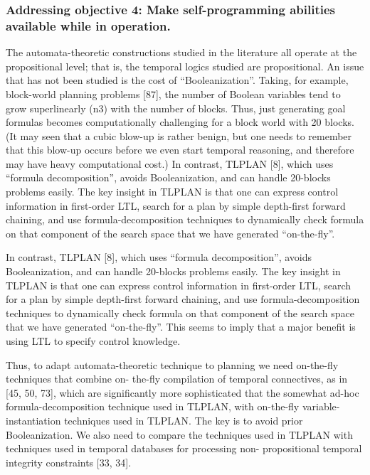 \subsubsection{Addressing objective 4: Make self-programming abilities available while in operation.} 

The automata-theoretic constructions studied in the literature all operate at the propositional level; that is, the temporal logics studied are propositional. An issue that has not been studied is the cost of “Booleanization”. Taking, for example, block-world planning problems [87], the number of Boolean variables tend to grow superlinearly (n3) with the number of blocks. Thus, just generating goal formulas becomes computationally challenging for a block world with 20 blocks. (It may seen that a cubic blow-up is rather benign, but one needs to remember that this blow-up occurs before we even start temporal reasoning, and therefore may have heavy computational cost.) In contrast, TLPLAN [8], which uses “formula decomposition”, avoids Booleanization, and can handle 20-blocks problems easily. The key insight in TLPLAN is that one can express control information in first-order LTL, search for a plan by simple depth-first forward chaining, and use formula-decomposition techniques to dynamically check formula on that component of the search space that we have generated “on-the-fly”.

In contrast, TLPLAN [8], which uses “formula decomposition”, avoids Booleanization, and can handle 20-blocks problems easily. The key insight in TLPLAN is that one can express control information in first-order LTL, search for a plan by simple depth-first forward chaining, and use formula-decomposition techniques to dynamically check formula on that component of the search space that we have generated “on-the-fly”.
This seems to imply that a major benefit is using LTL to specify control knowledge. 

Thus, to adapt automata-theoretic technique to planning we need on-the-fly techniques that combine on- the-fly compilation of temporal connectives, as in [45, 50, 73], which are significantly more sophisticated that the somewhat ad-hoc formula-decomposition technique used in TLPLAN, with on-the-fly variable- instantiation techniques used in TLPLAN. The key is to avoid prior Booleanization. We also need to compare the techniques used in TLPLAN with techniques used in temporal databases for processing non- propositional temporal integrity constraints [33, 34].


